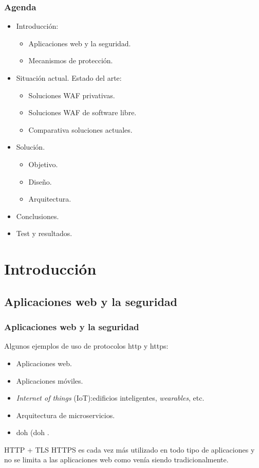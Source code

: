 \begin{frame}[shrink=20]
  \frametitle{Agenda}
  \begin{itemize}
    \item Introducción:
      \begin{itemize}
        \item Aplicaciones web y la seguridad.
        \item Mecanismos de protección.
      \end{itemize}
    \item Situación actual. Estado del arte:
      \begin{itemize}
        \item Soluciones WAF privativas.
        \item Soluciones WAF de software libre.
        \item Comparativa soluciones actuales.
      \end{itemize}
    \item Solución.
      \begin{itemize}
        \item Objetivo.
        \item Diseño.
        \item Arquitectura.
      \end{itemize}
    \item Conclusiones.
    \item Test y resultados.
  \end{itemize}
\end{frame}

\section{Introducción}
\subsection{Aplicaciones web y la seguridad}
\begin{frame}[shrink=20]
  \frametitle{Aplicaciones web y la seguridad}
  Algunos ejemplos de uso de protocolos \acrshort{http} y \acrshort{https}:
  \begin{itemize}
    \item Aplicaciones web.
    \item Aplicaciones móviles.
    \item {\em Internet of things} (IoT):edificios inteligentes, {\em wearables}, etc.
    \item Arquitectura de microservicios.
    \item \acrlong{doh} (\acrshort{doh} \cite{doh}.
  \end{itemize}
  \begin{block}{HTTP + TLS}
    HTTPS es cada vez más utilizado en todo tipo de aplicaciones y no se limita a las aplicaciones web como venía siendo tradicionalmente.
  \end{block}
\end{frame}

